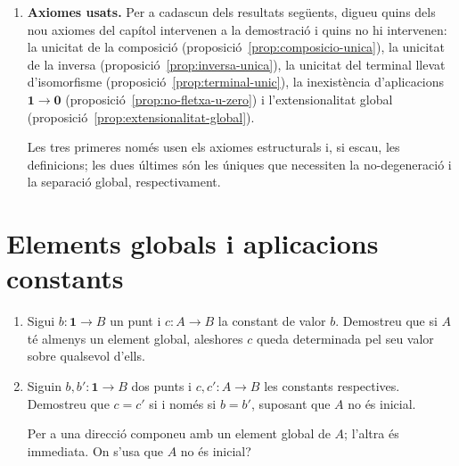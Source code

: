 \begin{enumerate}[resume]
  \item \textbf{Axiomes usats.} Per a cadascun dels resultats següents, digueu quins dels nou axiomes del capítol intervenen a la demostració i quins no hi intervenen: la unicitat de la composició (proposició~\ref{prop:composicio-unica}), la unicitat de la inversa (proposició~\ref{prop:inversa-unica}), la unicitat del terminal llevat d'isomorfisme (proposició~\ref{prop:terminal-unic}), la inexistència d'aplicacions \(\mathbf1\to\mathbf0\) (proposició~\ref{prop:no-fletxa-u-zero}) i l'extensionalitat global (proposició~\ref{prop:extensionalitat-global}). \begin{indicacio}Les tres primeres només usen els axiomes estructurals i, si escau, les definicions; les dues últimes són les úniques que necessiten la no-degeneració i la separació global, respectivament.\end{indicacio}
\end{enumerate}

\section{Elements globals i aplicacions constants}

\begin{enumerate}[resume]
  \item Sigui \(b\colon\mathbf1\to B\) un punt i \(c\colon A\to B\) la constant de valor \(b\). Demostreu que si \(A\) té almenys un element global, aleshores \(c\) queda determinada pel seu valor sobre qualsevol d'ells.

  \item Siguin \(b,b'\colon\mathbf1\to B\) dos punts i \(c,c'\colon A\to B\) les constants respectives. Demostreu que \(c=c'\) si i només si \(b=b'\), suposant que \(A\) no és inicial. \begin{indicacio}Per a una direcció componeu amb un element global de \(A\); l'altra és immediata. On s'usa que \(A\) no és inicial?\end{indicacio}
\end{enumerate}
